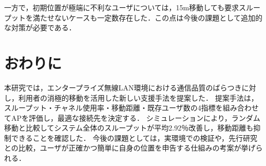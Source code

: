 \documentclass[dvipdfmx,twocolumn]{jsarticle}
\newcommand{\Note}[1]{\noindent \textbf{\textcolor{blue}{#1}}}
\begin{document}
一方で，初期位置が極端に不利なユーザについては，15m移動しても要求スループットを満たせないケースも一定数存在した．この点は今後の課題として追加的な対策が必要である．

\section{おわりに}
本研究では，エンタープライズ無線LAN環境における通信品質のばらつきに対し，利用者の消極的移動を活用した新しい支援手法を提案した．
提案手法は，スループット・チャネル使用率・移動距離・既存ユーザ数の4指標を組み合わせてAPを評価し，最適な接続先を決定する．
シミュレーションにより，ランダム移動と比較してシステム全体のスループットが平均2.92％改善し，移動距離も抑制できることを確認した．
今後の課題としては，実環境での検証や，先行研究との比較，ユーザが正確かつ簡単に自身の位置を申告する仕組みの考案が挙げられる．



\end{document}
